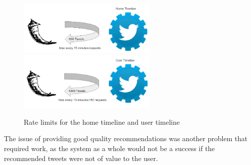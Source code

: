 \documentclass{article}
\begin{document}
\begin{figure}[H]
    \centering
    \includegraphics[width=0.6\textwidth]{rate_limit_1}
    \includegraphics[width=0.6\textwidth]{rate_limit_2}
    \caption{Rate limits for the home timeline and user timeline}
    \label{fig:my_label}
\end{figure}


The issue of providing good quality recommendations was another problem that required work, as the system as a whole would not be a success if the recommended tweets were not of value to the user. 



\end{document}

